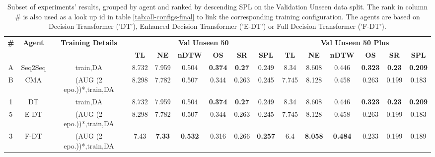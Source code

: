 \begin{table}
\centering
\caption{\label{tab:best}Subset of experiments' results, grouped by agent and ranked by descending SPL on the Validation Unseen data split. The rank in column \# is also used as a look up id in table \ref{tab:all-configs-final} to link the corresponding training configuration.     \newline The agents are based on Decision Transformer ('DT'), Enhanced Decision Transformer ('E-DT') or Full Decision Transformer ('F-DT').}
\begin{tabular}{@{\hskip3pt}c@{\hskip3pt}c@{\hskip3pt}c@{\hskip3pt}c@{\hskip3pt}c@{\hskip3pt}c@{\hskip3pt}c@{\hskip3pt}c@{\hskip3pt}c@{\hskip3pt}c@{\hskip3pt}c@{\hskip3pt}c@{\hskip3pt}c@{\hskip3pt}c@{\hskip3pt}c}
\toprule
\textbf{\#} & \textbf{Agent} & \textbf{Training Details} & \multicolumn{6}{c}{\textbf{Val Unseen 50}} & \multicolumn{6}{c}{\textbf{Val Unseen 50 Plus}} \\
 \textbf{~} &     \textbf{~} &                \textbf{~} &       \textbf{TL} &    \textbf{NE} &   \textbf{nDTW} &     \textbf{OS} &    \textbf{SR} &    \textbf{SPL} &         \textbf{TL} &     \textbf{NE} &   \textbf{nDTW} &     \textbf{OS} &    \textbf{SR} &    \textbf{SPL} \\
          A &             Seq2Seq &                  train,DA &             8.732 &          7.959 &           0.504 &  \textbf{0.374} &  \textbf{0.27} &           0.249 &                8.34 &           8.608 &           0.446 &  \textbf{0.323} &  \textbf{0.23} &  \textbf{0.209} \\
          B &           CMA &  (AUG (2 epo.))*,train,DA &             8.298 &          7.782 &           0.507 &           0.344 &          0.263 &           0.245 &               7.745 &           8.128 &           0.458 &           0.263 &          0.199 &           0.183 \\
\midrule
          1 &             DT &                  train,DA &             8.732 &          7.959 &           0.504 &  \textbf{0.374} &  \textbf{0.27} &           0.249 &                8.34 &           8.608 &           0.446 &  \textbf{0.323} &  \textbf{0.23} &  \textbf{0.209} \\
          5 &           E-DT &  (AUG (2 epo.))*,train,DA &             8.298 &          7.782 &           0.507 &           0.344 &          0.263 &           0.245 &               7.745 &           8.128 &           0.458 &           0.263 &          0.199 &           0.183 \\
          3 &           F-DT &  (AUG (2 epo.))*,train,DA &              7.43 &  \textbf{7.33} &  \textbf{0.532} &           0.316 &          0.266 &  \textbf{0.257} &                 6.4 &  \textbf{8.058} &  \textbf{0.484} &           0.233 &          0.199 &           0.189 \\
\bottomrule
\end{tabular}
\end{table}
